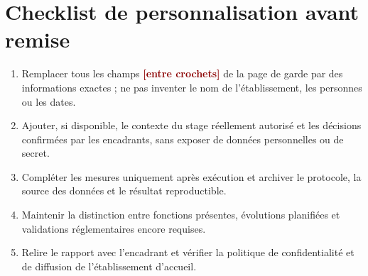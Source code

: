 \documentclass[11pt,a4paper]{report}
\newcommand{\placeholder}[1]{\textcolor{darkred}{\textbf{[#1]}}}
\begin{document}
\chapter{Checklist de personnalisation avant remise}
\begin{enumerate}
  \item Remplacer tous les champs \placeholder{entre crochets} de la page de
        garde par des informations exactes ; ne pas inventer le nom de
        l'établissement, les personnes ou les dates.
  \item Ajouter, si disponible, le contexte du stage réellement autorisé et
        les décisions confirmées par les encadrants, sans exposer de données
        personnelles ou de secret.
  \item Compléter les mesures uniquement après exécution et archiver le
        protocole, la source des données et le résultat reproductible.
  \item Maintenir la distinction entre fonctions présentes, évolutions
        planifiées et validations réglementaires encore requises.
  \item Relire le rapport avec l'encadrant et vérifier la politique de
        confidentialité et de diffusion de l'établissement d'accueil.
\end{enumerate}
\end{document}
